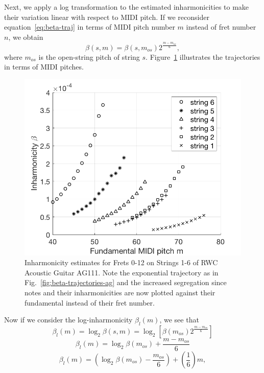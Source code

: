 \documentclass[convention,peer-reviewed]{aesconf}
\begin{document}
Next, we apply a log transformation to the estimated inharmonicities to make their variation linear with respect to MIDI pitch. If we reconsider equation~\eqref{eq:beta-traj} in terms of MIDI pitch number $m$ instead of fret number $n$, we obtain
\begin{equation}
\beta(s,m) = \beta(s,m_{os})2^{\frac{m-m_{os}}{6}},
\end{equation}
where $m_{os}$ is the open-string pitch of string $s$. Figure~\ref{fig:beta-v-midi} illustrates the trajectories in terms of MIDI pitches.
\begin{figure}[h] 
\centering
\includegraphics[scale=0.25]{beta-v-midi}
\caption{Inharmonicity estimates for Frets 0-12 on Strings 1-6 of RWC Acoustic Guitar AG111. Note the exponential trajectory as in Fig.~\ref{fig:beta-trajectories-ag} and the increased segregation since notes and their inharmonicities are now plotted against their fundamental instead of their fret number.}
\label{fig:beta-v-midi}
\end{figure}
Now if we consider the log-inharmonicity $\beta_{l}(m)$, we see that
\begin{equation}
\beta_l(m) = \log_2\beta(s,m) = \log_2[\beta(m_{os})2^{\frac{m-m_{os}}{6}}]
\end{equation}
\begin{equation}
\beta_l(m) = \log_2\beta(m_{os}) + \frac{m-m_{os}}{6}
\end{equation}
\begin{equation}
\beta_l(m) = (\log_2\beta(m_{os})-\frac{m_{os}}{6}) + (\frac{1}{6})m,
\end{equation}
\end{document}
